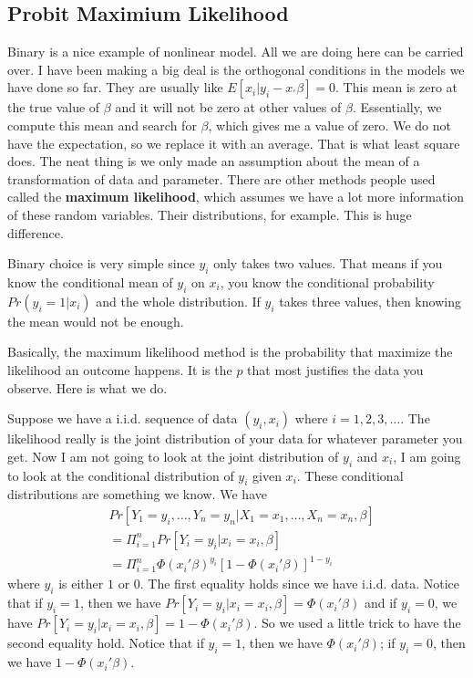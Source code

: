 \documentclass[11pt,a4paper]{amsart}
\theoremstyle{plain}
\theoremstyle{definition}
\begin{document}
\subsection{Probit Maximium Likelihood}
	Binary is a nice example of nonlinear model. All we are doing here can be carried over. I have been making a big deal is the orthogonal conditions in the models we have done so far. They are usually like $E[x_{i}|y_{i}-x_{'}\beta] = 0$. This mean is zero at the true value of $\beta$ and it will not be zero at other values of $\beta$. Essentially, we compute this mean and search for $\beta$, which gives me a value of zero. We do not have the expectation, so we replace it with an average. That is what least square does. The neat thing is we only made an assumption about the mean of a transformation of data and parameter. There are other methods people used called the \textbf{maximum likelihood}, which assumes we have a lot more information of these random variables. Their distributions, for example. This is huge difference. \par 
	Binary choice is very simple since $y_{i}$ only takes two values. That means if you know the conditional mean of $y_{i}$ on $x_{i}$, you know the conditional probability $Pr(y_{i}=1|x_{i})$ and the whole distribution. If $y_{i}$ takes three values, then knowing the mean would not be enough.\par 
	Basically, the maximum likelihood method is the probability that maximize the likelihood an outcome happens. It is the $p$ that most justifies the data you observe. Here is what we do.\par 
	Suppose we have a i.i.d. sequence of data $(y_{i}, x_{i})$ where $i = 1,2,3, \dots$. The likelihood really is the joint distribution of your data for whatever parameter you get. Now I am not going to look at the joint distribution of $y_{i}$ and $x_{i}$, I am going to look at the conditional distribution of $y_{i}$ given $x_{i}$. These conditional distributions are something we know. We have 
	\[	\begin{aligned}
			&Pr[Y_{1} = y_{i}, \dots, Y_{n}=y_{n} | X_{1}=x_{1}, \dots, X_{n}=x_{n}, \beta] \\
			&= \Pi_{i=1}^{n} Pr[Y_{i}=y_{i} | x_{i}=x_{i}, \beta] \\
			&=  \Pi_{i=1}^{n} \Phi(x_{i}'\beta)^{y_{i}} [1- \Phi(x_{i}'\beta)]^{1-y_{i}}
	\end{aligned}	\]
	where $y_{i}$ is either $1$ or $0$. The first equality holds since we have i.i.d. data. Notice that if $y_{i} = 1$, then we have $Pr[Y_{i}=y_{i} | x_{i}=x_{i}, \beta] = \Phi(x_{i}'\beta)$ and if $y_{i} = 0$, we have $Pr[Y_{i}=y_{i} | x_{i}=x_{i}, \beta] = 1- \Phi(x_{i}'\beta)$. So we used a little trick to have the second equality hold. Notice that if $y_{i} = 1$, then we have $\Phi(x_{i}'\beta)$; if $y_{i} = 0$, then we have $1- \Phi(x_{i}'\beta)$. \par 
\end{document}
